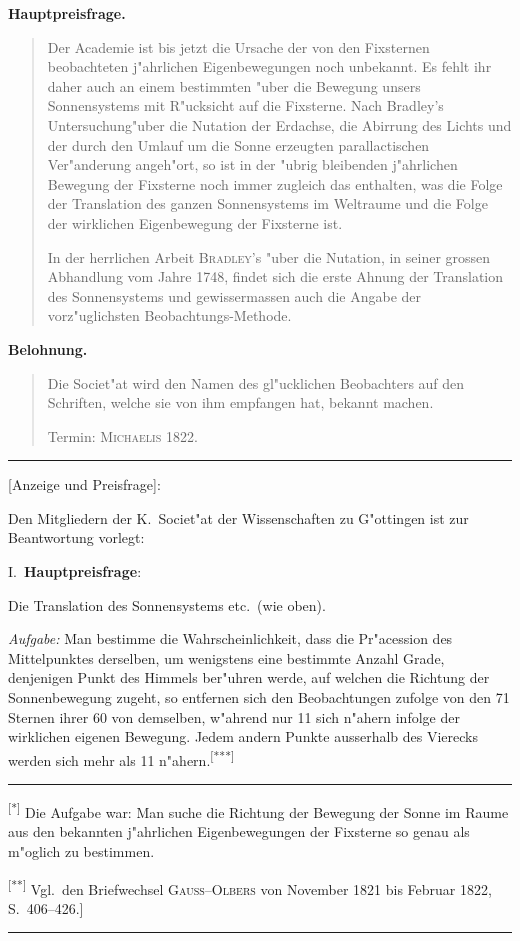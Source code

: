 \documentclass[12pt,a4paper]{article}
\theoremstyle{plain}
\theoremstyle{definition}
\theoremstyle{remark}
\begin{document}
\begin{center}
\textbf{Hauptpreisfrage.}
\end{center}

\begin{quote}
Der Academie ist bis jetzt die Ursache der von den Fixsternen beobachteten j"ahrlichen Eigenbewegungen noch unbekannt. Es fehlt ihr daher auch an einem bestimmten "uber die Bewegung unsers Sonnensystems mit R"ucksicht auf die Fixsterne. Nach Bradley's Untersuchung"uber die Nutation der Erdachse, die Abirrung des Lichts und der durch den Umlauf um die Sonne erzeugten parallactischen Ver"anderung angeh"ort, so ist in der "ubrig bleibenden j"ahrlichen Bewegung der Fixsterne noch immer zugleich das enthalten, was die Folge der Translation des ganzen Sonnensystems im Weltraume und die Folge der wirklichen Eigenbewegung der Fixsterne ist.

In der herrlichen Arbeit \textsc{Bradley}'s "uber die Nutation, in seiner grossen Abhandlung vom Jahre 1748, findet sich die erste Ahnung der Translation des Sonnensystems und gewissermassen auch die Angabe der vorz"uglichsten Beobachtungs-Methode.
\end{quote}

\begin{center}
\textbf{Belohnung.}
\end{center}

\begin{quote}
Die Societ"at wird den Namen des gl"ucklichen Beobachters auf den Schriften, welche sie von ihm empfangen hat, bekannt machen.

Termin: \textsc{Michaelis} 1822.
\end{quote}

\vspace{1em}
\noindent
\rule{\textwidth}{0.4pt}
{\small
[Anzeige und Preisfrage]:

Den Mitgliedern der K.\ Societ"at der Wissenschaften zu G"ottingen ist zur Beantwortung vorlegt:

I.\ \textbf{Hauptpreisfrage}:

\glq{}Die\grq{} Translation des Sonnensystems etc.\ (wie oben).

{\itshape Aufgabe:} Man bestimme die Wahrscheinlichkeit, dass die Pr"acession des Mittelpunktes derselben, um wenigstens eine bestimmte Anzahl Grade, denjenigen Punkt des Himmels ber"uhren werde, auf welchen die Richtung der Sonnenbewegung zugeht, so entfernen sich den Beobachtungen zufolge von den 71 Sternen ihrer 60 von demselben, w"ahrend nur 11 sich n"ahern infolge der wirklichen eigenen Bewegung. Jedem andern Punkte ausserhalb des Vierecks werden sich mehr als 11 n"ahern.\textsuperscript{[***]}

\rule{\textwidth}{0.4pt}
\textsuperscript{[*]} Die Aufgabe war: Man suche die Richtung der Bewegung der Sonne im Raume aus den bekannten j"ahrlichen Eigenbewegungen der Fixsterne so genau als m"oglich zu bestimmen.

\textsuperscript{[**]} Vgl.\ den Briefwechsel \textsc{Gauss}--\textsc{Olbers} von November 1821 bis Februar 1822, S.\ 406--426.]
}
\rule{\textwidth}{0.4pt}
\end{document}
